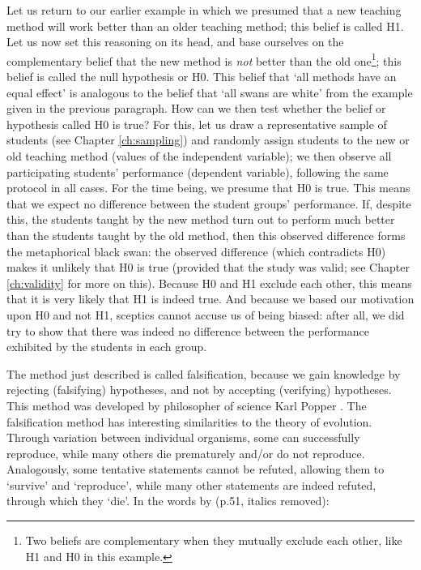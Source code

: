 \documentclass[
]{book}
\begin{document}
Let us return to our earlier example in which we presumed that a new teaching method will work better than an older teaching method; this belief is called H1. Let us now set this reasoning on its head, and base ourselves on the complementary belief that the new method is \emph{not} better than the old one\footnote{Two beliefs are complementary when they mutually exclude each other, like H1 and H0 in this example.}; this belief is called the null hypothesis or H0. This belief that `all methods have an equal effect' is analogous to the belief that `all swans are white' from the example given in the previous paragraph. How can we then test whether the belief or hypothesis called H0 is true? For this, let us draw a representative sample of students (see Chapter \ref{ch:sampling}) and randomly assign students to the new or old teaching method (values of the independent variable); we then observe all participating students' performance (dependent variable), following the same protocol in all cases. For the time being, we presume that H0 is true. This means that we expect no difference between the student groups' performance. If, despite this, the students taught by the new method turn out to perform much better than the students taught by the old method, then this observed difference forms the metaphorical black swan: the observed difference (which contradicts H0) makes it unlikely that H0 is true (provided that the study was valid; see Chapter \ref{ch:validity} for more on this). Because H0 and H1 exclude each other, this means that it is very likely that H1 is indeed true. And because we based our motivation upon H0 and not H1, sceptics cannot accuse us of being biased: after all, we did try to show that there was indeed no difference between the performance exhibited by the students in each group.

The method just described is called falsification, because we gain knowledge by rejecting (falsifying) hypotheses, and not by accepting (verifying) hypotheses. This method was developed by philosopher of science Karl Popper \citep{Popp35, Popp59, Popp63}. The falsification method has interesting similarities to the theory of evolution. Through variation between individual organisms, some can successfully reproduce, while many others die prematurely and/or do not reproduce. Analogously, some tentative statements cannot be refuted, allowing them to `survive' and `reproduce', while many other statements are indeed refuted, through which they `die'. In the words by \citet{Popp63} (p.51, italics removed):
\end{document}
